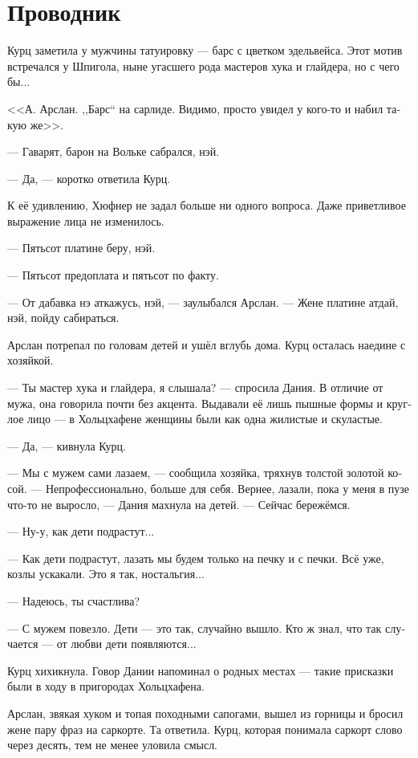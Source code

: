 \documentclass[a4paper,12pt,fleqn]{book}\usepackage{cooltooltips}\usepackage{polyglossia}\setdefaultlanguage[babelshorthands=true]{russian}\setotherlanguage{english}\defaultfontfeatures{Ligatures=TeX,Mapping=tex-text} \usepackage{xcolor}\definecolor{lightgray}{HTML}{bbbbbb}\color{lightgray}\newcommand{\ml}[3]{\textenglish{\textcolor{black}{#3}}}
\begin{document}
\section{Проводник}

Курц заметила у мужчины татуировку --- барс с цветком эдельвейса.
Этот мотив встречался у Шпигола, ныне угасшего рода мастеров хука и глайдера, но с чего бы...

<<А.
Арслан.
,,Барс`` на сарлиде.
Видимо, просто увидел у кого-то и набил такую же>>.

--- Гаварят, барон на Вольке сабрался, нэй.

--- Да, --- коротко ответила Курц.

К её удивлению, Хюфнер не задал больше ни одного вопроса.
Даже приветливое выражение лица не изменилось.

--- Пятьсот платине беру, нэй.

--- Пятьсот предоплата и пятьсот по факту.

--- От дабавка нэ аткажусь, нэй, --- заулыбался Арслан.
--- Жене платине атдай, нэй, пойду сабираться.

Арслан потрепал по головам детей и ушёл вглубь дома.
Курц осталась наедине с хозяйкой.

--- Ты мастер хука и глайдера, я слышала? --- спросила Дания.
В отличие от мужа, она говорила почти без акцента.
Выдавали её лишь пышные формы и круглое лицо --- в Хольцхафене женщины были как одна жилистые и скуластые.

--- Да, --- кивнула Курц.

--- Мы с мужем сами лазаем, --- сообщила хозяйка, тряхнув толстой золотой косой.
--- Непрофессионально, больше для себя.
Вернее, лазали, пока у меня в пузе что-то не выросло, --- Дания махнула на детей.
--- Сейчас бережёмся.

--- Ну-у, как дети подрастут...

--- Как дети подрастут, лазать мы будем только на печку и с печки.
Всё уже, козлы ускакали.
Это я так, ностальгия...

--- Надеюсь, ты счастлива?

--- С мужем повезло.
Дети --- это так, случайно вышло.
Кто ж знал, что так случается --- от любви дети появляются...

Курц хихикнула.
Говор Дании напоминал о родных местах --- такие присказки были в ходу в пригородах Хольцхафена.

Арслан, звякая хуком и топая походными сапогами, вышел из горницы и бросил жене пару фраз на саркорте.
Та ответила.
Курц, которая понимала саркорт слово через десять, тем не менее уловила смысл.
\end{document}
